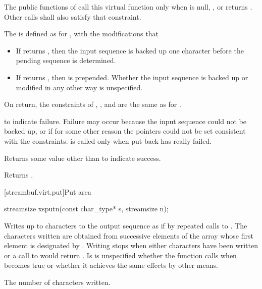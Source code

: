 \begin{itemdescr}
\pnum
\remarks
The public functions of
call this virtual function only when
is null,
,
or
returns
.
Other calls shall also satisfy that constraint.

The
is defined as for
,
with the modifications that
\begin{itemize}
\item
If
returns
,
then the input sequence is backed up one character before the pending sequence is determined.
\item
If
returns , then  is prepended.
Whether the input sequence is backed up or modified in any other way is unspecified.
\end{itemize}

\pnum
\postcondition
On return, the constraints of
,
,
and
are the same as for
.

\pnum
\returns
{}
to indicate failure.
Failure may occur because the input sequence could not be backed up, or if for some
other reason the pointers could not be set consistent with the constraints.
is called only when put back has really failed.

\pnum
Returns some value other than
to indicate success.

\pnum
{}
Returns
.
\end{itemdescr}

[streambuf.virt.put]{Put area}

%
\begin{itemdecl}
streamsize xsputn(const char_type* s, streamsize n);
\end{itemdecl}

\begin{itemdescr}
\pnum
\effects
Writes up to  characters to the output sequence as if
by repeated calls to
.
The characters written are obtained from successive elements of
the array whose first element is designated by .
Writing stops when either  characters have been written or
a call to
would return
.
Is is unspecified whether the function calls  when  becomes true or whether it achieves the same effects by other means.

\pnum
\returns
The number of characters written.
\end{itemdescr}

